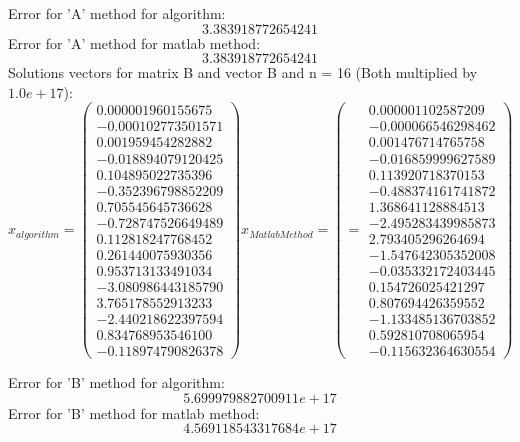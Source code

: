 \documentclass{report}
\begin{document}
Error for 'A' method for algorithm: \[ 3.383918772654241 \]
Error for 'A' method for matlab method: \[ 3.383918772654241 \]
\newpage
Solutions vectors for matrix B and vector B and n = 16 (Both multiplied by $ 1.0e+17 $):
\[ x_{algorithm} = \left( \begin{array}{cc}
  0.000001960155675 \\
  -0.000102773501571 \\
  0.001959454282882 \\
  -0.018894079120425 \\
  0.104895022735396 \\
  -0.352396798852209 \\
  0.705545645736628 \\
  -0.728747526649489 \\
  0.112818247768452 \\
  0.261440075930356 \\
  0.953713133491034 \\
  -3.080986443185790 \\
  3.765178552913233 \\
  -2.440218622397594 \\
  0.834768953546100 \\
  -0.118974790826378
\end{array} \right)
%
x_{Matlab Method} = \left(  = \begin{array}{cc}
  0.000001102587209 \\
  -0.000066546298462 \\
  0.001476714765758 \\
  -0.016859999627589 \\
  0.113920718370153 \\
  -0.488374161741872 \\
  1.368641128884513 \\
  -2.495283439985873 \\
  2.793405296264694 \\
  -1.547642305352008 \\
  -0.035332172403445 \\
  0.154726025421297 \\
  0.807694426359552 \\
  -1.133485136703852 \\
  0.592810708065954 \\
  -0.115632364630554
\end{array} \right)
\]

Error for 'B' method for algorithm: \[ 5.699979882700911e+17 \]
Error for 'B' method for matlab method: \[ 4.569118543317684e+17 \]
\end{document}
